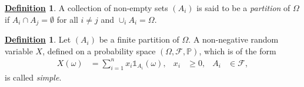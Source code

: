 \documentclass[12pt]{book}
\numberwithin{equation}{chapter}
\theoremstyle{plain}
\numberwithin{theorem}{section}
\theoremstyle{definition}
\newtheorem{definition}[theorem]{\underline{Definition}}
\numberwithin{exercise}{chapter}
\newcommand{\<}{\langle}
\renewcommand{\>}{\rangle}
\renewcommand{\(}{\left(}
\renewcommand{\)}{\right)}
\renewcommand{\[}{\left[}
\renewcommand{\]}{\right]}
\newcommand\Ib{\mathds{1}} 	%
\newcommand\Pb{\mathds{P}}
\newcommand\Fc{\mathscr{F}}
\newcommand\om{\omega}
\newcommand\Om{\Omega}
\begin{document}
\begin{definition}
\label{def:partition}
A collection of non-empty sets $(A_i)$ is said to be a \textit{partition} of $\Om$ if $A_i \cap A_j = \emptyset$ for all $i \neq j$ and $\cup_i A_i = \Om$. 
\end{definition} 


\begin{definition}
Let $(A_i)$ be a finite partition of $\Om$.
A non-negative random variable $X$, defined on a probability space $(\Om,\Fc,\Pb)$, which is of the form
\begin{align}
X(\om)
	&=	\sum_{i=1}^n x_i \Ib_{A_i}(\om) , &
x_i
	&\geq 0 , &
A_i
	&\in \Fc , \label{eq:X.simple}
\end{align}
is called \emph{simple}. 
\end{definition} 
\end{document}
